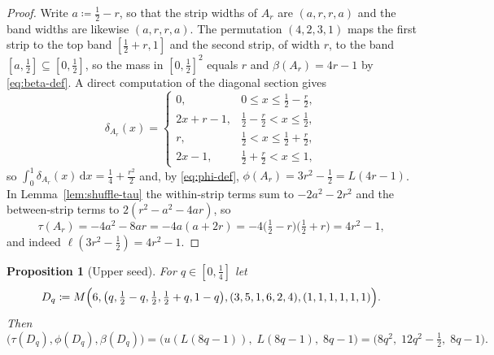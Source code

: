\documentclass{article}
\newtheorem{proposition}[theorem]{Proposition}
\newcommand{\de}{\,\mathrm{d}}
\begin{document}
\begin{proof}
Write $a\coloneqq \frac12-r$, so that the strip widths of $A_r$ are $(a,r,r,a)$ and the band widths are likewise $(a,r,r,a)$.
The permutation $(4,2,3,1)$ maps the first strip to the top band $[\frac12+r,1]$ and the second strip, of width $r$, to the band $[a,\frac12]\subseteq[0,\frac12]$, so the mass in $[0,\frac12]^2$ equals $r$ and $\beta(A_r)=4r-1$ by \eqref{eq:beta-def}.
A direct computation of the diagonal section gives
\[
\delta_{A_r}(x)=
\begin{cases}
0, & 0\le x\le \frac12-\frac r2,\\
2x+r-1, & \frac12-\frac r2<x\le \frac12,\\
r, & \frac12<x\le \frac12+\frac r2,\\
2x-1, & \frac12+\frac r2<x\le 1,
\end{cases}
\]
so $\int_0^1\delta_{A_r}(x)\de x=\frac14+\frac{r^2}{2}$ and, by \eqref{eq:phi-def}, $\phi(A_r)=3r^2-\frac12=L(4r-1)$.
In Lemma~\ref{lem:shuffle-tau} the within-strip terms sum to $-2a^2-2r^2$ and the between-strip terms to $2(r^2-a^2-4ar)$, so
\[
\tau(A_r)=-4a^2-8ar=-4a(a+2r)=-4\bigl(\tfrac12-r\bigr)\bigl(\tfrac12+r\bigr)=4r^2-1,
\]
and indeed $\ell(3r^2-\frac12)=4r^2-1$.
\end{proof}

\begin{proposition}[Upper seed]\label{prop:upper-seed}
For $q\in[0,\frac14]$ let
\[
D_q\coloneqq M\Bigl(6,\bigl(q,\tfrac12-q,\tfrac12,\tfrac12+q,1-q\bigr),(3,5,1,6,2,4),(1,1,1,1,1,1)\Bigr).
\]
Then
\[
\bigl(\tau(D_q),\phi(D_q),\beta(D_q)\bigr)
=\bigl(u(L(8q-1)),\;L(8q-1),\;8q-1\bigr)
=\bigl(8q^2,\;12q^2-\tfrac12,\;8q-1\bigr).
\]
\end{proposition}
\end{document}
